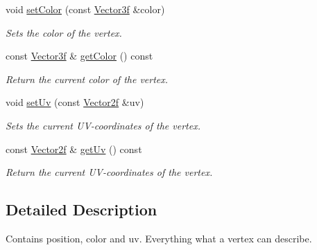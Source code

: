 \begin{DoxyCompactItemize}
void \hyperlink{classburn_1_1_vertex_a57e2bf8a6e58c7d02c8431f03239cc6b}{set\-Color} (const \hyperlink{namespaceburn_a9d6d349c94bc4dc9699427216128a0ef}{Vector3f} \&color)
\begin{DoxyCompactList}\small\item\em Sets the color of the vertex. \end{DoxyCompactList}\item 
const \hyperlink{namespaceburn_a9d6d349c94bc4dc9699427216128a0ef}{Vector3f} \& \hyperlink{classburn_1_1_vertex_a1dcb11a63a04b0e279e8a69df85dd8d6}{get\-Color} () const 
\begin{DoxyCompactList}\small\item\em Return the current color of the vertex. \end{DoxyCompactList}\item 
void \hyperlink{classburn_1_1_vertex_afc4eff1b4065852cb856b690006e0bd8}{set\-Uv} (const \hyperlink{namespaceburn_a2af71ec5609a2f2d501827804e86a9b8}{Vector2f} \&uv)
\begin{DoxyCompactList}\small\item\em Sets the current U\-V-\/coordinates of the vertex. \end{DoxyCompactList}\item 
const \hyperlink{namespaceburn_a2af71ec5609a2f2d501827804e86a9b8}{Vector2f} \& \hyperlink{classburn_1_1_vertex_a277e9b082825c211acf730b46580301a}{get\-Uv} () const 
\begin{DoxyCompactList}\small\item\em Return the current U\-V-\/coordinates of the vertex. \end{DoxyCompactList}\end{DoxyCompactItemize}


\subsection{Detailed Description}
Contains position, color and uv. Everything what a vertex can describe. 

